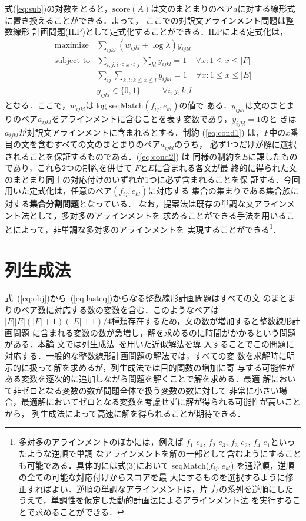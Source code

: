 \documentclass[japanese]{jnlp_1.4}
\begin{document}
式(\ref{eq:sub})の対数をとると，$\mathrm{score}(A)$は文のまとまりのペア$a$に対する線形式に置き換えることができる．よって，
ここでの対訳文アラインメント問題は整数線形
計画問題(ILP)として定式化することができる．ILPによる定式化は，
\begin{align}
 \mbox{maximize} & \sum_{ijkl} (w_{ijkl} + \log \lambda) y_{ijkl} \label{eq:obj}\\
 \mbox{subject to} & \sum_{i,j: i\leq x \leq j}\sum_{kl} y_{ijkl} = 1 ~~~~~\forall x : 1 \leq x
  \leq |F| \label{eq:cond1}\\
&\sum_{ij}\sum_{k,l: k \leq x \leq l} y_{ijkl} = 1 ~~~~~\forall x : 1 \leq x
  \leq |E| \label{eq:cond2}\\
 & y_{ijkl} \in \{0, 1\} ~~~~~~~~~~~~\forall i,j,k,l 
\label{eq:lasteq}
\end{align}
となる．ここで，$w_{ijkl}$は$\log{\mathrm{seqMatch}(f_{ij}, e_{kl})}$の値で
ある．$y_{ijkl}$は文のまとまりのペア$a_{ijkl}$をアラインメントに含むことを表す変数であり，$y_{ijkl} =1$のと
きは$a_{ijkl}$が対訳文アラインメントに含まれるとする．制約
(\ref{eq:cond1}) は，$F$中の$x$番目の文を含むすべての文のまとまりのペア$a_{ijkl}$のうち，
必ず1つだけが解に選択されることを保証するものである．(\ref{eq:cond2}) は
同様の制約を$E$に課したものであり，これら2つの制約を併せて $F$と$E$に含まれる各文が最
終的に得られた文のまとまり同士の対応付けのいずれか1つに必ず含まれることを保
証する．今回用いた定式化は，任意のペア$(f_{ij}, e_{kl})$に対応する
集合の集まりである集合族に対する\textbf{集合分割問題}となっている．
なお，提案法は既存の単調な文アラインメント法として，多対多のアラインメントを
求めることができる手法を用いることによって，非単調な多対多のアラインメントを
実現することができる\footnote{多対多のアラインメントのほかには，例えば
$f_1$-$e_4$, $f_2$-$e_3$, $f_3$-$e_2$, $f_4$-$e_1$といったような逆順で単調
なアラインメントを解の一部として含むようにすることも可能である．具体的には式(3)において
seqMatch($f_{ij}, e_{kl}$) を通常順，逆順の全ての可能な対応付けからスコアを最
大にするものを選択するように修正すればよい．逆順の単調なアラインメントは，片
方の系列を逆順にしたうえで，単調性を仮定した動的計画法によるアラインメント法
を実行することで求めることができる．}．


\section{列生成法}
\label{sec:colgen}

式~(\ref{eq:obj})から~(\ref{eq:lasteq})からなる整数線形計画問題はすべての文
のまとまりのペア数に対応する数の変数を含む．このようなペアは
$|F||E|(|F|+1)(|E|+1)/4$種類存在するため，文の数が増加すると整数線形計画問題
に含まれる変数の数が急増し，解を求めるのに時間がかかるという問題がある．本論
文では列生成法~\cite{lubbecke05:_selec_topic_colum_gener}を用いた近似解法を導
入することでこの問題に対応する．一般的な整数線形計画問題の解法では，すべての変
数を求解時に明示的に扱って解を求めるが，列生成法では目的関数の増加に寄
与する可能性がある変数を逐次的に追加しながら問題を解くことで解を求める．最適
解において非ゼロとなる変数の数が問題全体で扱う変数の数に対して
非常に小さい場合，最適解においてゼロとなる変数を考慮せずに解が得られる可能性が高いことから，
列生成法によって高速に解を得られることが期待できる．
\end{document}
